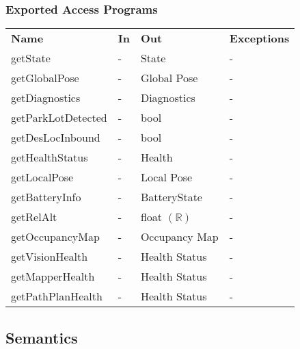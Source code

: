 \documentclass[12pt, titlepage]{article}
\begin{document}
\subsubsection{Exported Access Programs}
\begin{center}
\begin{tabular}{p{3.5cm} p{2.5cm} p{5cm} p{2.5cm}}
\hline
\textbf{Name} & \textbf{In} & \textbf{Out} & \textbf{Exceptions} \\
getState &  - & State & - \\
getGlobalPose &  - & Global Pose  & - \\
getDiagnostics &  - & Diagnostics  & - \\
getParkLotDetected &  - & bool & - \\
getDesLocInbound &  - & bool & - \\
getHealthStatus &  - & Health  & - \\
getLocalPose &  - & Local Pose & - \\
getBatteryInfo &  - & BatteryState & - \\
getRelAlt &  - & float $(\mathbb{R})$ & - \\
getOccupancyMap &  - & Occupancy Map & - \\
getVisionHealth &  - & Health Status & - \\
getMapperHealth &  - & Health Status & - \\
getPathPlanHealth &  - & Health Status & - \\
\hline
\hline
\end{tabular}
\end{center}
\subsection{Semantics}
\end{document}
